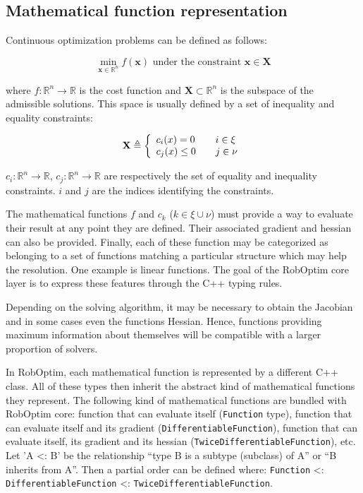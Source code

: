 \documentclass[conference,final,a4paper,twocolumn,9pt]{IEEEtran}
\begin{document}
\subsection{Mathematical function representation}


Continuous optimization problems can be defined as follows:

\begin{equation}\label{eq:optimization}
  \min_{\mathbf{x} \in \mathbb{R}^n} f(\mathbf{x}) \text{ under the constraint } \mathbf{x} \in \mathbf{X}
\end{equation}

where $f : \mathbb{R}^n \rightarrow \mathbb{R}$ is the cost function
and $\mathbf{X} \subset \mathbb{R}^n$ is the subspace of the
admissible solutions. This space is usually defined by a set of
inequality and equality constraints:

\begin{equation}
  \mathbf{X} \triangleq \left\{
  \begin{array}{l l}
    c_i (x) = 0    & \quad i \in \xi \\
    c_j (x) \leq 0 & \quad j \in \nu \\
  \end{array} \right.
\end{equation}

$c_i : \mathbb{R}^n \rightarrow \mathbb{R}$, $c_j : \mathbb{R}^n
\rightarrow \mathbb{R}$ are respectively the set of equality and
inequality constraints. $i$ and $j$ are the indices identifying the
constraints.

The mathematical functions $f$ and $c_k$ ($k \in \xi \cup \nu$) must
provide a way to evaluate their result at any point they are
defined. Their associated gradient and hessian can also be
provided. Finally, each of these function may be categorized as
belonging to a set of functions matching a particular structure which
may help the resolution. One example is linear functions. The goal of
the RobOptim core layer is to express these features through the C++
typing rules.


Depending on the solving algorithm, it may be necessary to obtain the
Jacobian and in some cases even the functions Hessian. Hence,
functions providing maximum information about themselves will be
compatible with a larger proportion of solvers.


In RobOptim, each mathematical function is represented by a different
C++ class. All of these types then inherit the abstract kind of
mathematical functions they represent. The following kind of
mathematical functions are bundled with RobOptim core: function that
can evaluate itself (\texttt{Function} type), function that can
evaluate itself and its gradient (\texttt{DifferentiableFunction}),
function that can evaluate itself, its gradient and its hessian
(\texttt{TwiceDifferentiableFunction}), etc.  Let 'A <: B' be the
relationship ``type B is a subtype (subclass) of A'' or ``B inherits
from A''. Then a partial order can be defined where:
\texttt{Function} <: \texttt{DifferentiableFunction} <: \texttt{TwiceDifferentiableFunction}.
\end{document}
